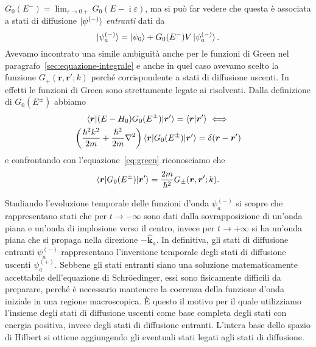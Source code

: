 \documentclass[a4paper,fleqn,twoside,12pt]{article}
\renewcommand{\epsilon}{\varepsilon}
\DeclareMathOperator{\uimm}{\mathrm{i}} %
\newcommand*{\versor}[1]{\hat{\bm{#1}}}
\begin{document}
$G_{0}(E^{-}) = \lim_{\epsilon \to 0+} G_{0}(E - \uimm \epsilon)$, ma si può far
vedere che questa è associata a stati di diffusione $\ket{\psi^{(-)}}$
\emph{entranti} dati da
\begin{equation}
  \ket{\psi_{a}^{(-)}} = \ket{\psi_{0}} + G_{0}(E^{-})V\ket{\psi_{a}^{(-)}}.
\end{equation}
Avevamo incontrato una simile ambiguità anche per le funzioni di Green nel
paragrafo~\ref{sec:equazione-integrale} e anche in quel caso avevamo scelto la
funzione $G_{+}(\bm{r},\bm{r}';k)$ perché corrispondente a stati di diffusione
uscenti.  In effetti le funzioni di Green sono strettamente legate ai
risolventi.  Dalla definizione di $G_{0}(E^{\pm})$ abbiamo
\begin{equation}
  \begin{gathered}
    \braket{\bm{r} | (E - H_{0})G_{0}(E^{\pm}) | \bm{r}'} = \braket{\bm{r} |
      \bm{r}'} \iff \\
    \bigg(\frac{\hslash^{2}k^{2}}{2m} + \frac{\hslash^{2}}{2m}\nabla^{2}\bigg)
    \braket{\bm{r} | G_{0}(E^{\pm}) | \bm{r}'} = \delta(\bm{r} - \bm{r}')
  \end{gathered}
\end{equation}
e confrontando con l'equazione~\eqref{eq:green} riconosciamo che
\begin{equation}
  \braket{\bm{r} | G_{0}(E^{\pm}) | \bm{r}'} =
  \frac{2m}{\hslash^{2}}G_{\pm}(\bm{r},\bm{r}';k).
\end{equation}

Studiando l'evoluzione temporale delle funzioni d'onda $\psi_{a}^{(-)}$ si
scopre che rappresentano stati che per $t \to -\infty$ sono dati dalla
sovrapposizione di un'onda piana e un'onda di implosione verso il centro, invece
per $t \to +\infty$ si ha un'onda piana che si propaga nella direzione
$-\versor{k}_{a}$.  In definitiva, gli stati di diffusione entranti
$\psi_{a}^{(-)}$ rappresentano l'inversione temporale degli stati di diffusione
uscenti $\psi_{a}^{(+)}$.  Sebbene gli stati entranti siano una soluzione
matematicamente accettabile dell'equazione di Schröedinger, essi sono
fisicamente difficili da preparare, perché è necessario mantenere la coerenza
della funzione d'onda iniziale in una regione macroscopica.  È questo il motivo
per il quale utilizziamo l'insieme degli stati di diffusione uscenti come base
completa degli stati con energia positiva, invece degli stati di diffusione
entranti.  L'intera base dello spazio di Hilbert si ottiene aggiungendo gli
eventuali stati legati agli stati di diffusione.
\end{document}
